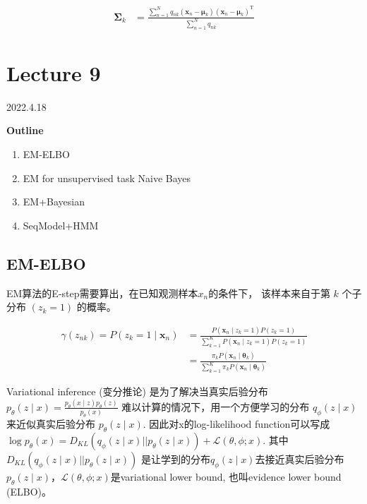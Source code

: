 \documentclass[UTF8]{ctexart}
\begin{document}
$$
\begin{aligned}
\boldsymbol{\Sigma}_{k} &=\frac{\sum_{n=1}^{N} q_{n k}\left(\boldsymbol{x}_{n}-\boldsymbol{\mu}_{k}\right)\left(\boldsymbol{x}_{n}-\boldsymbol{\mu}_{k}\right)^{\mathrm{T}}}{\sum_{n=1}^{N} q_{n k}}
\end{aligned}
$$


\newpage
\section{Lecture 9}
2022.4.18

\textbf{Outline}
\begin{enumerate}
    \item EM-ELBO
    \item EM for unsupervised task Naive Bayes
    \item EM+Bayesian
    \item SeqModel+HMM
\end{enumerate}

\subsection{EM-ELBO}
EM算法的E-step需要算出，在已知观测样本$x_n$的条件下，
该样本来自于第 $k$ 个子分布 $\left(z_{k}=1\right)$ 的概率。

$$
\begin{aligned}
\gamma\left(z_{n k}\right)=P\left(z_{k}=1 \mid \boldsymbol{x}_{n}\right) &=\frac{P\left(\boldsymbol{x}_{n} \mid z_{k}=1\right) P\left(z_{k}=1\right)}{\sum_{k=1}^{K} P\left(\boldsymbol{x}_{n} \mid z_{k}=1\right) P\left(z_{k}=1\right)} \\
&=\frac{\pi_{k} P\left(\boldsymbol{x}_{n} \mid \boldsymbol{\theta}_{k}\right)}{\sum_{k=1}^{K} \pi_{k} P\left(\boldsymbol{x}_{n} \mid \boldsymbol{\theta}_{k}\right)}
\end{aligned}
$$

Variational inference (变分推论) 是为了解决当真实后验分布 
$p_{\theta}(z \mid x)=\frac{p_{\theta}(x \mid z) p_{\theta}(z)}{p_{\theta}(x)}$ 难以计算的情况下，用一个方便学习的分布 $q_{\phi}(z \mid x)$来近似真实后验分布 $p_{\theta}(z \mid x)$.
因此对x的log-likelihood function可以写成 
$\log p_{\theta}(x)=D_{K L}\left(q_{\phi}(z \mid x)|| p_{\theta}(z \mid x)\right)+\mathcal{L}(\theta, \phi ; x)$. 
其中$D_{K L}\left(q_{\phi}(z \mid x)|| p_{\theta}(z \mid x)\right)$ 
是让学到的分布$q_{\phi}(z \mid x)$去接近真实后验分布$p_{\theta}(z \mid x)$，$\mathcal{L}(\theta, \phi ; x)$是variational lower bound, 也叫evidence lower bound (ELBO)。
\end{document}
